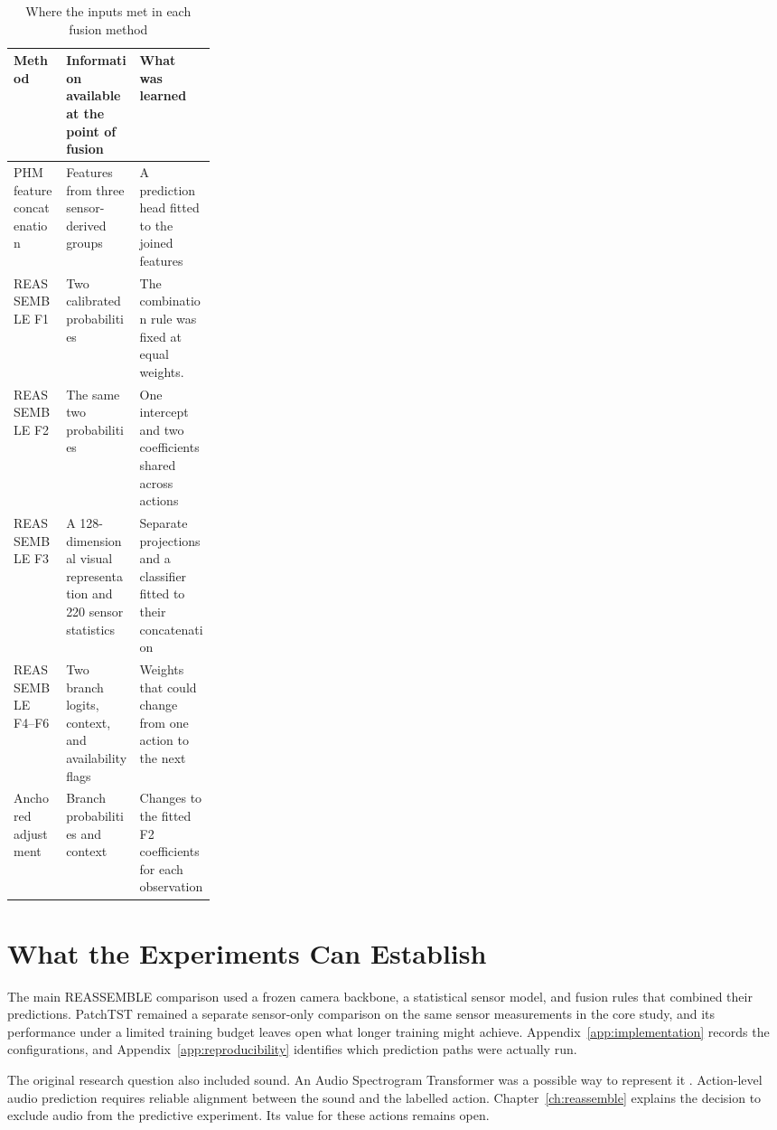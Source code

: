 \begin{table}[htbp]
\centering
\caption{Where the inputs met in each fusion method}
\label{tab:ch3-fusion-interfaces}
\small\singlespacing
\setlength{\tabcolsep}{4pt}
\renewcommand{\arraystretch}{1.15}
\begin{tabularx}{\linewidth}{@{}P{0.26\linewidth}YY@{}}
\toprule
Method & Information available at the point of fusion & What
was learned \\
\midrule
PHM feature concatenation & Features from three sensor-derived groups & A prediction
head fitted to the joined features \\
REASSEMBLE F1 & Two calibrated probabilities & The combination rule was fixed at equal weights. \\
REASSEMBLE F2 & The same two probabilities & One intercept and two coefficients shared
across actions \\
REASSEMBLE F3 & A 128-dimensional visual representation and 220 sensor statistics &
Separate projections and a classifier fitted to their concatenation \\
REASSEMBLE F4--F6 & Two branch logits, context, and availability flags & Weights that
could change from one action to the next \\
Anchored adjustment & Branch probabilities and context & Changes to the fitted F2
coefficients for each observation \\
\bottomrule
\end{tabularx}
\end{table}

\section{What the Experiments Can Establish}

The main REASSEMBLE comparison used a frozen camera backbone, a statistical sensor
model, and fusion rules that combined their predictions. PatchTST remained a separate
sensor-only comparison on the same sensor measurements in the core study, and its
performance under a limited training budget leaves open what longer
training might achieve. Appendix~\ref{app:implementation} records the configurations,
and Appendix~\ref{app:reproducibility} identifies which prediction paths were actually
run.

The original research question also included sound. An Audio Spectrogram Transformer was
a possible way to represent it \parencite{P011}. Action-level audio prediction requires
reliable alignment between the sound and the labelled action. Chapter~\ref{ch:reassemble}
explains the decision to exclude audio from the predictive experiment. Its value for
these actions remains open.

